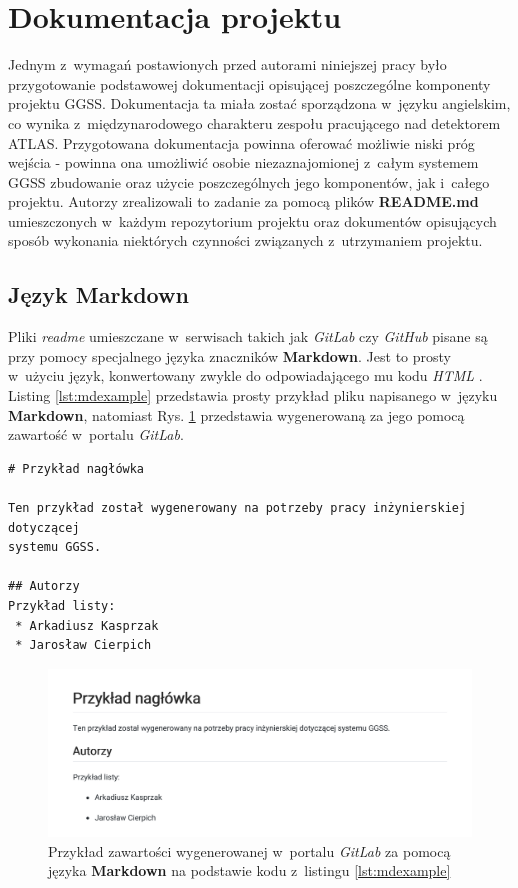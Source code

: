 \newpage
\section{Dokumentacja projektu}
Jednym z~wymagań postawionych przed autorami niniejszej pracy było przygotowanie podstawowej dokumentacji opisującej poszczególne komponenty projektu GGSS. Dokumentacja ta miała zostać sporządzona w~języku angielskim, co wynika z~międzynarodowego charakteru zespołu pracującego nad detektorem ATLAS. Przygotowana dokumentacja powinna oferować możliwie niski próg wejścia - powinna ona umożliwić osobie niezaznajomionej z~całym systemem GGSS zbudowanie oraz użycie poszczególnych jego komponentów, jak i~całego projektu. Autorzy zrealizowali to zadanie za pomocą plików \textbf{README.md} umieszczonych w~każdym repozytorium projektu oraz dokumentów opisujących sposób wykonania niektórych czynności związanych z~utrzymaniem projektu.

\subsection{Język Markdown}
Pliki \textit{readme} umieszczane w~serwisach takich jak \textit{GitLab} czy \textit{GitHub} pisane są przy pomocy specjalnego języka znaczników \textbf{Markdown}. Jest to prosty w~użyciu język, konwertowany zwykle do odpowiadającego mu kodu \textit{HTML} \cite{Markdown1}. Listing \ref{lst:mdexample} przedstawia prosty przykład pliku napisanego w~języku \textbf{Markdown}, natomiast Rys. \ref{fig:markdownExample} przedstawia wygenerowaną za jego pomocą zawartość w~portalu \textit{GitLab}.

\begin{lstlisting}[caption={Przykład prostego pliku napisanego w~języku \textbf{Markdown}}, label={lst:mdexample}]
# Przykład nagłówka

Ten przykład został wygenerowany na potrzeby pracy inżynierskiej dotyczącej 
systemu GGSS.

## Autorzy
Przykład listy:
 * Arkadiusz Kasprzak
 * Jarosław Cierpich
\end{lstlisting}

\begin{figure}
\centering
\includegraphics[width=\textwidth]{res/MarkdownExample}
\caption{Przykład zawartości wygenerowanej w~portalu \textit{GitLab} za pomocą języka \textbf{Markdown} na podstawie kodu z~listingu \ref{lst:mdexample}}
\label{fig:markdownExample}
\end{figure}

